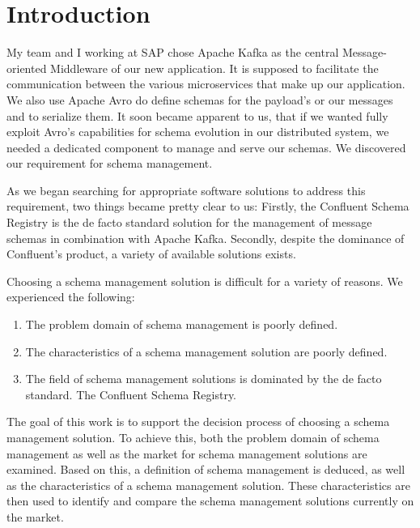 
\section{Introduction}\label{sec:introduction}

My team and I working at SAP chose Apache Kafka as the central Message-oriented Middleware of our new application.
It is supposed to facilitate the communication between the various microservices that make up our application.
We also use Apache Avro do define schemas for the payload's or our messages and to serialize them.
It soon became apparent to us, that if we wanted fully exploit Avro's capabilities for schema evolution in our distributed system, we needed a dedicated component to manage and serve our schemas.
We discovered our requirement for schema management.

As we began searching for appropriate software solutions to address this requirement, two things became pretty clear to us: Firstly, the Confluent Schema Registry is the de facto standard solution for the management of message schemas in combination with Apache Kafka. Secondly, despite the dominance of Confluent's product, a variety of available solutions exists.

Choosing a schema management solution is difficult for a variety of reasons. We experienced the following:

\begin{enumerate}
  \item The problem domain of schema management is poorly defined.
  \item The characteristics of a schema management solution are poorly defined.
  \item The field of schema management solutions is dominated by the de facto standard. The Confluent Schema Registry.
\end{enumerate}

The goal of this work is to support the decision process of choosing a schema management solution.
To achieve this, both the problem domain of schema management as well as the market for schema management solutions are examined.
Based on this, a definition of schema management is deduced, as well as the characteristics of a schema management solution.
These characteristics are then used to identify and compare the schema management solutions currently on the market.

